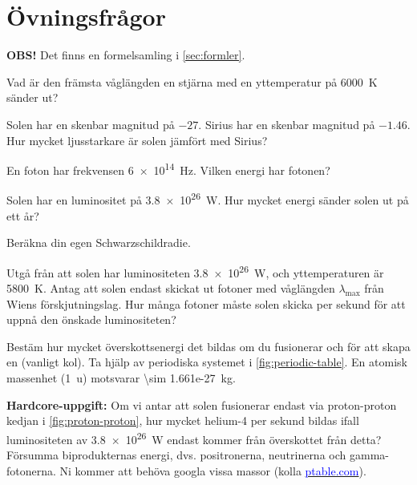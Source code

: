 \section{Övningsfrågor}
\textbf{OBS!} Det finns en formelsamling i \vref{sec:formler}.

\begin{exercise}
    Vad är den främsta våglängden en stjärna med en yttemperatur på \SI{6000}{\kelvin} sänder ut?
\end{exercise}

\begin{exercise}
    Solen har en skenbar magnitud på $-27$. Sirius har en skenbar magnitud på $\num{-1.46}$. Hur mycket ljusstarkare är solen jämfört med Sirius?
\end{exercise}

\begin{exercise}
    En foton har frekvensen \SI{6e14}{\hertz}. Vilken energi har fotonen?
\end{exercise}

\begin{exercise}
    Solen har en luminositet på \SI{3.8e26}{\watt}. Hur mycket energi sänder solen ut på ett år?
\end{exercise}

\begin{exercise}
    Beräkna din egen Schwarzschildradie.
\end{exercise}

\begin{exercise}
    Utgå från att solen har luminositeten \qty{3.8e26}{W}, och yttemperaturen är \qty{5800}{K}. Antag att solen endast skickat ut fotoner med våglängden $\lambda_\text{max}$ från Wiens förskjutningslag. Hur många fotoner måste solen skicka per sekund för att uppnå den önskade luminositeten?
\end{exercise}

\begin{exercise}
    Bestäm hur mycket överskottsenergi det bildas om du fusionerar  och  för att skapa en  (vanligt kol). Ta hjälp av periodiska systemet i \vref{fig:periodic-table}. En atomisk massenhet (\qty{1}{u}) motsvarar \qty{\sim 1.661e-27}{kg}.
\end{exercise}

\begin{exercise}
    \textbf{Hardcore-uppgift:} Om vi antar att solen fusionerar endast via proton-proton kedjan i \vref{fig:proton-proton}, hur mycket helium-4 per sekund bildas ifall luminositeten av \qty{3.8e26}{W} endast kommer från överskottet från detta? Försumma biprodukternas energi, dvs. positronerna, neutrinerna och gamma-fotonerna. Ni kommer att behöva googla vissa massor (kolla \hyperlink{https://www.ptable.com/}{\textcolor{blue}{ptable.com}}).
\end{exercise}